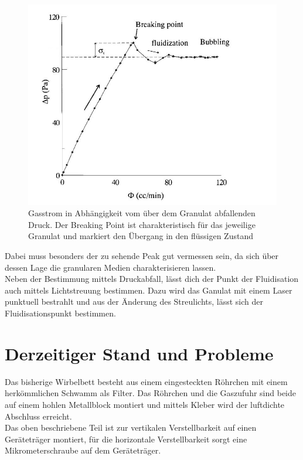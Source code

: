 \begin{figure}[h!]
	\begin{center}
		\includegraphics[scale=0.6]{Castellanos_Diagramm.jpg}
		\caption{Gasstrom in Abhängigkeit vom über dem Granulat abfallenden Druck. Der Breaking Point ist charakteristisch für das jeweilige Granulat und markiert den Übergang in den flüssigen Zustand \cite{Castellanos2000}}
	\end{center}
\end{figure}

Dabei muss besonders der zu sehende Peak gut vermessen sein, da sich über dessen Lage die granularen Medien charakterisieren lassen. \\
Neben der Bestimmung mittels Druckabfall, lässt dich der Punkt der Fluidisation auch mittels Lichtstreuung bestimmen. Dazu wird das Ganulat mit einem Laser punktuell bestrahlt und aus der Änderung des Streulichts, lässt sich der Fluidisationspunkt bestimmen. 


\newpage

\section{Derzeitiger Stand und Probleme}


Das bisherige Wirbelbett besteht aus einem eingesteckten Röhrchen mit einem herkömmlichen Schwamm als Filter. Das Röhrchen und die Gaszufuhr sind beide auf einem hohlen Metallblock montiert und mittels Kleber wird der luftdichte Abschluss erreicht. \\
Das oben beschriebene Teil ist zur vertikalen Verstellbarkeit auf einen Geräteträger montiert, für die horizontale Verstellbarkeit sorgt eine Mikrometerschraube auf dem Geräteträger. 

